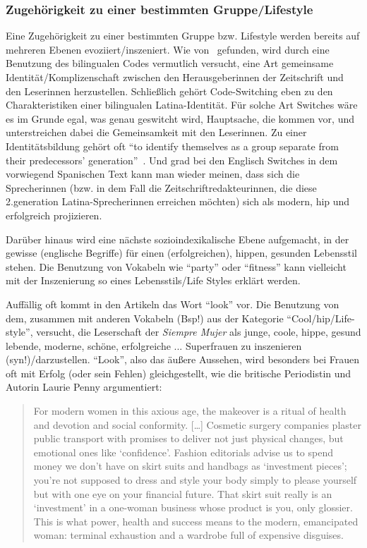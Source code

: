 \subsubsection{Zugehörigkeit zu einer bestimmten Gruppe/Lifestyle}
Eine Zugehörigkeit zu einer bestimmten Gruppe bzw. Lifestyle werden bereits auf mehreren Ebenen evoziiert/inszeniert.
Wie von~\cite{Ticknor12} gefunden, wird durch eine Benutzung des bilingualen Codes vermutlich versucht, eine Art gemeinsame Identität/Komplizenschaft zwischen den Herausgeberinnen der Zeitschrift und den Leserinnen herzustellen.
Schließlich gehört Code-Switching eben zu den Charakteristiken einer bilingualen Latina-Identität.
Für solche Art Switches wäre es im Grunde egal, was genau geswitcht wird, Hauptsache, die kommen vor, und unterstreichen dabei die Gemeinsamkeit mit den Leserinnen.
Zu einer Identitätsbildung gehört oft ``to identify themselves as a group separate from their predecessors’ generation''~\cite[]{Mahootian05}.
Und grad bei den Englisch Switches in dem vorwiegend Spanischen Text kann man wieder meinen, dass sich die Sprecherinnen (bzw. in dem Fall die Zeitschriftredakteurinnen, die diese 2.generation Latina-Sprecherinnen erreichen möchten) sich als modern, hip und erfolgreich projizieren.

Darüber hinaus wird eine nächste sozioindexikalische Ebene aufgemacht, in der gewisse (englische Begriffe) für einen (erfolgreichen), hippen, gesunden Lebensstil stehen. %
Die Benutzung von Vokabeln wie ``party'' oder ``fitness'' kann vielleicht mit der Inszenierung so eines Lebensstils/Life Styles erklärt werden.

Auffällig oft kommt in den Artikeln das Wort ``look'' vor.
Die Benutzung von dem, zusammen mit anderen Vokabeln (Bsp!) aus der Kategorie ``Cool/hip/Life-style'', versucht, die Leserschaft der \textit{Siempre Mujer} als junge, coole, hippe, gesund lebende, moderne, schöne, erfolgreiche ... Superfrauen zu inszenieren (syn!)/darzustellen.
``Look'', also das äußere Aussehen, wird besonders bei Frauen oft mit Erfolg (oder sein Fehlen) gleichgestellt, wie die britische Periodistin und Autorin Laurie Penny argumentiert:

\begin{quote}
For modern women in this axious age, the makeover is a ritual of health and devotion and social conformity.
[\ldots]
Cosmetic surgery companies plaster public transport with promises to deliver not just physical changes, but emotional ones like `confidence'.
Fashion editorials advise us to spend money we don't have on skirt suits and handbags as `investment pieces'; you're not supposed to dress and style your body simply to please yourself but with one eye on your financial future.
That skirt suit really is an `investment' in a one-woman business whose product is you, only glossier.
This is what power, health and success means to the modern, emancipated woman: terminal exhaustion and a wardrobe full of expensive disguises.~\cite[p.41-42]{Penny14}
\end{quote}

